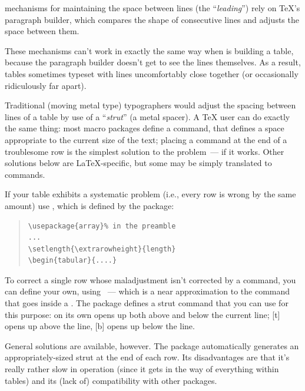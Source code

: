 
\AllTeX{} mechanisms for maintaining the space between lines (the
``\emph{leading}'') rely on \TeX{}'s paragraph builder, which compares
the shape of consecutive lines and adjusts the space between them.

These mechanisms can't work in exactly the same way when \AllTeX{} is
building a table, because the paragraph builder doesn't get to see the
lines themselves.  As a result, tables sometimes typeset with lines
uncomfortably close together (or occasionally ridiculously far apart).

Traditional (moving metal type) typographers would adjust the spacing
between lines of a table by use of a ``\emph{strut}'' (a metal
spacer).  A \TeX{} user can do exactly the same thing: most macro
packages define a  command, that defines a space appropriate
to the current size of the text; placing a  command at the
end of a troublesome row is the simplest solution to the problem~---
if it works.  Other solutions below are \LaTeX{}-specific, but some
may be simply translated to \plaintex{} commands.

If your table exhibits a systematic problem (i.e., every row is wrong
by the same amount) use , which is defined by the
 package:
\begin{quote}
\begin{verbatim}
\usepackage{array}% in the preamble
...
\setlength{\extrarowheight}{length}
\begin{tabular}{....}
\end{verbatim}
\end{quote}

To correct a single row whose maladjustment isn't corrected by a
 command, you can define your own, using
~--- which is a near approximation to the
command that goes inside a .  The  package
defines a strut command that you can use for this purpose:
 on its own opens up both above and below the current
line; [t] opens up above the line,
[b] opens up below the line.

General solutions are available, however.  The  package
automatically generates an appropriately-sized strut at the end of
each row.  Its disadvantages are that it's really rather slow in
operation (since it gets in the way of everything within tables) and
its (lack of) compatibility with other packages.

